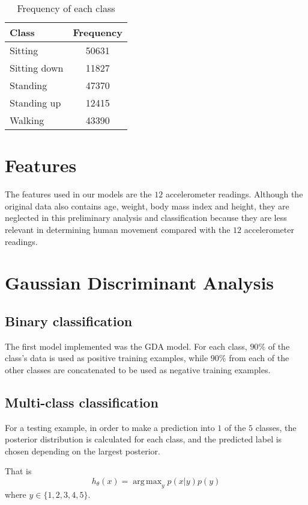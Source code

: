 \documentclass{cs229report}
\DeclareMathOperator{\argmax}{arg\,max}
\begin{document}
\begin{table}[!h]
  \centering
  \caption{Frequency of each class}
  \begin{tabular}[]{|l|c|} \hline
    \bf {Class} & \bf {Frequency} \\ \hline
    Sitting & 50631 \\ \hline
    Sitting down & 11827 \\ \hline
    Standing & 47370 \\ \hline
    Standing up & 12415 \\ \hline
    Walking & 43390 \\ \hline
  \end{tabular}
\end{table}

\section{Features}
The features used in our models are the $12$ accelerometer readings. Although the original data also contains age, weight, body mass index and height, they are neglected in this preliminary analysis and classification because they are less relevant in determining human movement compared with the $12$ accelerometer readings.

\section{Gaussian Discriminant Analysis}
\subsection{Binary classification}
The first model implemented was the GDA model. For each class,
$90\%$ of the class's data is used as positive training examples,
while $90\%$ from each of the other classes are concatenated 
to be used as negative training examples.
\subsection{Multi-class classification}
For a testing example, in order to make a prediction into 
$1$ of the $5$ classes, the posterior distribution is calculated for
each class, and the predicted label is chosen depending on the largest
posterior.

That is
\begin{equation*}
  h_\theta(x) = \argmax_y p(x|y)p(y)
\end{equation*} where $y \in \lbrace 1,2,3,4,5 \rbrace$.
\end{document}
